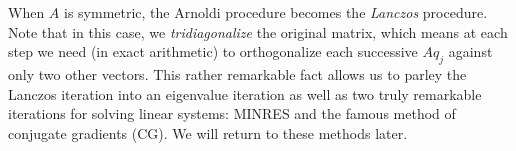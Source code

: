 \documentclass[12pt, leqno]{article}
\begin{document}
When $A$ is symmetric, the Arnoldi procedure becomes the {\em Lanczos}
procedure.  Note that in this case, we {\em tridiagonalize} the
original matrix, which means at each step we need (in exact
arithmetic) to orthogonalize each successive $Aq_j$ against only two
other vectors.  This rather remarkable fact allows us to parley the
Lanczos iteration into an eigenvalue iteration as well as two truly
remarkable iterations for solving linear systems: MINRES and the
famous method of conjugate gradients (CG).  We will return to these
methods later.
\end{document}
